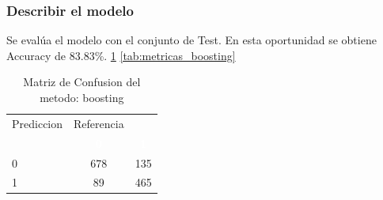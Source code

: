 \subsubsection{Describir el modelo}

Se evalúa el modelo con el conjunto de Test. En esta oportunidad se obtiene  Accuracy de 83.83\%. \ref{tab:MatrizConf_boosting} \ref{tab:metricas_boosting}

\begin{table}[!h]
	
	\caption{\label{tab:MatrizConf_boosting}Matriz de Confusion del metodo: boosting }
	\centering
	\begin{tabular}[t]{lcc}
		\toprule
		\multicolumn{1}{c}{Prediccion} & \multicolumn{1}{c}{Referencia} & \multicolumn{1}{c}{ } \\
		\cmidrule(l{3pt}r{3pt}){1-1} \cmidrule(l{3pt}r{3pt}){2-2}
		\rowcolor{black}  \multicolumn{1}{c}{\textcolor{white}{\textbf{ }}} & \multicolumn{1}{c}{\textcolor{white}{\textbf{0}}} & \multicolumn{1}{c}{\textcolor{white}{\textbf{1}}}\\
		\midrule
		\rowcolor{gray!6}  0 & 678 & 135\\
		1 & 89 & 465\\
		\bottomrule
	\end{tabular}
\end{table}

